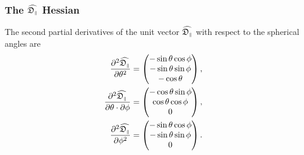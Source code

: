 \subsubsection{The $\widehat{\mathfrak{D}_{\scriptscriptstyle \parallel}}$ Hessian}

The second partial derivatives of the unit vector $\widehat{\mathfrak{D}_{\scriptscriptstyle \parallel}}$ with respect to the spherical angles are
\begin{subequations}
\begin{align}
    \frac{\partial^2 \widehat{\mathfrak{D}_{\scriptscriptstyle \parallel}}}{\partial \theta^2} &= \begin{pmatrix}
        -\sin \theta \cos \phi \\
        -\sin \theta \sin \phi \\
        -\cos \theta \\
    \end{pmatrix}, \\
    \frac{\partial^2 \widehat{\mathfrak{D}_{\scriptscriptstyle \parallel}}}{\partial \theta \cdot \partial \phi} &= \begin{pmatrix}
        -\cos \theta \sin \phi \\
        \cos \theta \cos \phi \\
        0 \\
    \end{pmatrix}, \\
    \frac{\partial^2 \widehat{\mathfrak{D}_{\scriptscriptstyle \parallel}}}{\partial \phi^2} &= \begin{pmatrix}
        -\sin \theta \cos \phi \\
        -\sin \theta \sin \phi \\
        0 \\
    \end{pmatrix}.
\end{align}
\end{subequations}





